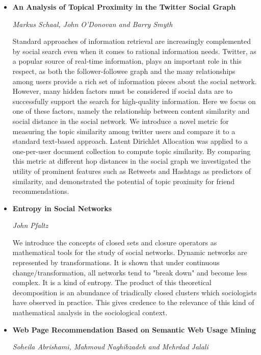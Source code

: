 \documentclass[a4paper,12pt,svgnames]{report}
\begin{document}
\begin{itemize}
\item \textbf{An Analysis of Topical Proximity in the Twitter Social Graph}

\textit{Markus Schaal, John O'Donovan and Barry Smyth}

Standard approaches of information retrieval are increasingly complemented by
social search even when it comes to rational information needs. Twitter, as a
popular source of real-time information, plays an important role in this
respect, as both the follower-followee graph and the many relationships among
users provide a rich set of information pieces about the social network.
However, many hidden factors must be considered if social data are to
successfully support the search for high-quality information.
Here we focus on one of these factors, namely the relationship between content
similarity and social distance in the social network. We introduce a novel
metric for measuring the topic similarity among twitter users and compare it to
a standard text-based approach. Latent Dirichlet Allocation was applied
to a one-per-user document collection to compute topic similarity. By comparing
this metric at different hop
distances in the social graph we investigated the utility of prominent features
such as Retweets and Hashtags as predictors of similarity, and demonstrated the
potential of topic proximity for friend recommendations.

\item \textbf{Entropy in Social Networks}

\textit{John Pfaltz}

We introduce the concepts of closed sets and closure operators as mathematical
tools for the study of social networks. Dynamic networks are represented by
transformations.
It is shown that under continuous change/transformation, all networks tend to
"break down" and become less complex. It is a kind of entropy.
The product of this theoretical decomposition is an abundance of triadically
closed clusters which sociologists have observed in practice. This gives
credence to the relevance of this kind of mathematical analysis in the
sociological context.

\item \textbf{Web Page Recommendation Based on Semantic Web Usage Mining}

\textit{Soheila Abrishami, Mahmoud Naghibzadeh and Mehrdad Jalali}


\end{itemize}
\end{document}
